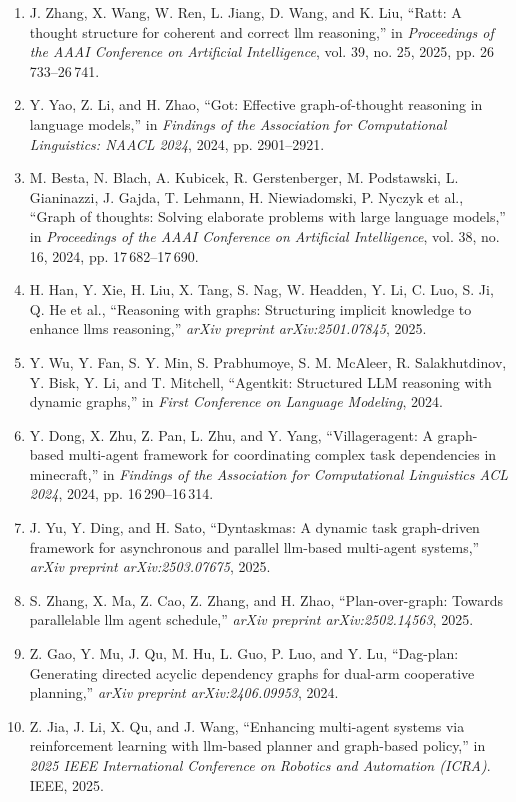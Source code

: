 \documentclass[10pt,UTF8,fontset=fandol]{ctexart}
\begin{document}
\begin{enumerate}[leftmargin=2.4em,labelsep=0.4em,itemsep=0.15em]
\item J. Zhang, X. Wang, W. Ren, L. Jiang, D. Wang, and K. Liu, ``Ratt: A thought structure for coherent and correct llm reasoning,'' in \textit{Proceedings of the AAAI Conference on Artificial Intelligence}, vol. 39, no. 25, 2025, pp. 26\,733--26\,741.
\item Y. Yao, Z. Li, and H. Zhao, ``Got: Effective graph-of-thought reasoning in language models,'' in \textit{Findings of the Association for Computational Linguistics: NAACL 2024}, 2024, pp. 2901--2921.
\item M. Besta, N. Blach, A. Kubicek, R. Gerstenberger, M. Podstawski, L. Gianinazzi, J. Gajda, T. Lehmann, H. Niewiadomski, P. Nyczyk et al., ``Graph of thoughts: Solving elaborate problems with large language models,'' in \textit{Proceedings of the AAAI Conference on Artificial Intelligence}, vol. 38, no. 16, 2024, pp. 17\,682--17\,690.
\item H. Han, Y. Xie, H. Liu, X. Tang, S. Nag, W. Headden, Y. Li, C. Luo, S. Ji, Q. He et al., ``Reasoning with graphs: Structuring implicit knowledge to enhance llms reasoning,'' \textit{arXiv preprint arXiv:2501.07845}, 2025.
\item Y. Wu, Y. Fan, S. Y. Min, S. Prabhumoye, S. M. McAleer, R. Salakhutdinov, Y. Bisk, Y. Li, and T. Mitchell, ``Agentkit: Structured LLM reasoning with dynamic graphs,'' in \textit{First Conference on Language Modeling}, 2024.
\item Y. Dong, X. Zhu, Z. Pan, L. Zhu, and Y. Yang, ``Villageragent: A graph-based multi-agent framework for coordinating complex task dependencies in minecraft,'' in \textit{Findings of the Association for Computational Linguistics ACL 2024}, 2024, pp. 16\,290--16\,314.
\item J. Yu, Y. Ding, and H. Sato, ``Dyntaskmas: A dynamic task graph-driven framework for asynchronous and parallel llm-based multi-agent systems,'' \textit{arXiv preprint arXiv:2503.07675}, 2025.
\item S. Zhang, X. Ma, Z. Cao, Z. Zhang, and H. Zhao, ``Plan-over-graph: Towards parallelable llm agent schedule,'' \textit{arXiv preprint arXiv:2502.14563}, 2025.
\item Z. Gao, Y. Mu, J. Qu, M. Hu, L. Guo, P. Luo, and Y. Lu, ``Dag-plan: Generating directed acyclic dependency graphs for dual-arm cooperative planning,'' \textit{arXiv preprint arXiv:2406.09953}, 2024.
\item Z. Jia, J. Li, X. Qu, and J. Wang, ``Enhancing multi-agent systems via reinforcement learning with llm-based planner and graph-based policy,'' in \textit{2025 IEEE International Conference on Robotics and Automation (ICRA)}. IEEE, 2025.

\end{enumerate}
\end{document}
